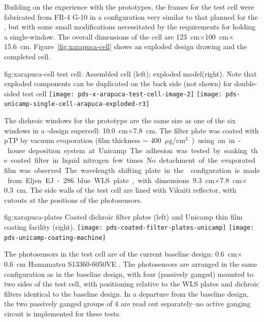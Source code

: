 Building on the experience with the  prototypes, the frames for the test cell were fabricated from FR-4 G-10 in a configuration very similar to that planned for the , but with some small modifications necessitated by the requirements for holding a single-window. The overall dimensions of the cell are \SI{123}{cm}$\times$\SI{100}{cm}$\times$\SI{15.6}{cm}. Figure~\ref{fig:xarapuca-cell} shows an exploded design drawing and the completed cell. 

\begin{dunefigure}{fig:xarapuca-cell}
{ test cell:  Assembled cell (left); exploded model(right).  Note that exploded components can be duplicated on the back side (not shown) for double-sided test cell} 
	\texttt{[image: pds-x-arapuca-test-cell-image-2]}
	    \texttt{[image: pds-unicamp-single-cell-arapuca-exploded-r3]}
\end{dunefigure}


The dichroic windows for the prototype are the same size as one of the six windows in a -design  supercell: \SI{10.0}{cm}$\times$\SI{7.8}{cm}. The filter plate was coated with pTP by vacuum evaporation (film thickness $\sim$ \SI{400}{${\mu}$g/cm$^2$})  using an in-house deposition system at Unicamp. The adhesion was tested by soaking the coated filter in liquid nitrogen few times. No detachment of the evaporated film was observed

The wavelength shifting plate in the  configuration is made from Eljen EJ-286 blue WLS plate, with dimensions \SI{9.3}{cm}$\times$\SI{7.8}{cm}$\times$\SI{0.3}{cm}.  The side walls of the test cell are lined with Vikuiti reflector, with cutouts at the positions of the photosensors.

\begin{dunefigure}{fig:xarapuca-plates}
{Coated dichroic filter plates (left) and Unicamp thin film coating facility (right).} 
	\texttt{[image: pds-coated-filter-plates-unicamp]}\quad
	\texttt{[image: pds-unicamp-coating-machine]}
\end{dunefigure}

The photosensors in the test cell are of the current baseline design:  \SI{0.6}{cm}$\times$\SI{0.6}{cm} Hamamatsu S13360-6050VE .  The photosensors are arranged in the same configuration as in the baseline design, with four  (passively ganged) mounted to two sides of the test cell, with positioning relative to the WLS plates and dichroic filters identical to the baseline design.  In a departure from the baseline design, the two passively ganged groups of 4  are read out separately--no active ganging circuit is implemented for these tests. 

